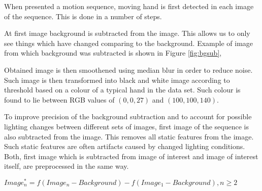 When presented a motion sequence, moving hand is first detected in each image of the sequence. This is done in a number of steps.

At first image background is subtracted from the image. This allows us to only see things which have changed comparing to the background. Example of image from which background was subtracted is shown in Figure \ref{fig:bgsub},

Obtained image is then smoothened using median blur in order to reduce noise. Such image is then transformed into black and white image according to threshold based on a colour of a typical hand in the data set. Such colour is found to lie between RGB values of $(0, 0, 27)$ and $(100, 100, 140)$.

To improve precision of the background subtraction and to account for possible lighting changes between different sets of images, first image of the sequence is also subtracted from the image. This removes all static features from the image. Such static features are often artifacts caused by changed lighting conditions. Both, first image which is subtracted from image of interest and image of interest itself, are preprocessed in the same way.

\begin{math}
Image^*_n = f(Image_n - Background) - f(Image_1 - Background), n \geq 2
\end{math}

